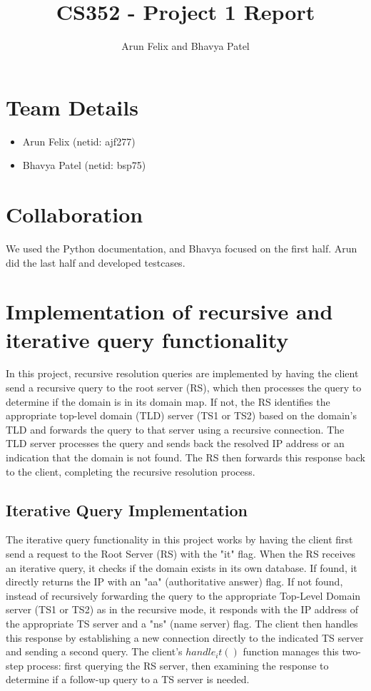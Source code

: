 \documentclass{article}
\begin{document}
\title{CS352 - Project 1 Report}
\author{Arun Felix and Bhavya Patel}
\maketitle

\section{Team Details}

\begin{itemize}
    \item Arun Felix (netid: ajf277)
    \item Bhavya Patel (netid: bsp75)
\end{itemize}

\section{Collaboration}

We used the Python documentation, and Bhavya focused on the first half. Arun did the last half and developed testcases.

\section{Implementation of recursive and iterative query functionality}

In this project, recursive resolution queries are implemented by having the client send a recursive query to the root server (RS), which then processes the query to determine if the domain is in its domain map. 
If not, the RS identifies the appropriate top-level domain (TLD) server (TS1 or TS2) based on the domain's TLD and forwards the query to that server using a recursive connection. 
The TLD server processes the query and sends back the resolved IP address or an indication that the domain is not found. 
The RS then forwards this response back to the client, completing the recursive resolution process.

\subsection{Iterative Query Implementation}

The iterative query functionality in this project works by having the client first send a request to the Root Server (RS) with the "it" flag. When the RS receives an iterative query, it checks if the domain exists in its own database. 
If found, it directly returns the IP with an "aa" (authoritative answer) flag. 
If not found, instead of recursively forwarding the query to the appropriate Top-Level Domain server (TS1 or TS2) as in the recursive mode, it responds with the IP address of the appropriate TS server and a "ns" (name server) flag. 
The client then handles this response by establishing a new connection directly to the indicated TS server and sending a second query. The client's $handle_it()$ function manages this two-step process: first querying the RS server, then examining the response to determine if a follow-up query to a TS server is needed. 
\end{document}
